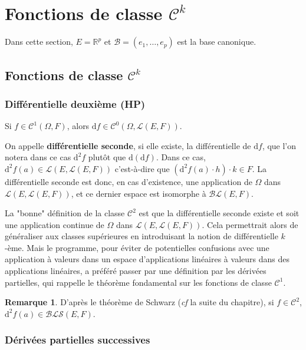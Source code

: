 \documentclass[french]{article}
\newcommand{\R}{\mathbb{R}}
\renewcommand{\d}{\text{d}}
\theoremstyle{plain}
\theoremstyle{definition}
\newtheorem*{rmq}{Remarque}
\theoremstyle{remark}
\begin{document}
\section{Fonctions de classe $\mathcal{C}^k$}

Dans cette section, $E=\R^p$ et $\mathcal{B}=(e_1,\ldots,e_p)$ est la base canonique.

\subsection{Fonctions de classe $\mathcal{C}^k$}

\subsubsection*{Différentielle deuxième (HP)}

Si $f\in\mathcal{C}^1(\Omega,F)$, alors $\d f\in\mathcal{C}^0(\Omega,\mathcal{L}(E,F))$.

\begin{dfn}
	On appelle \textbf{différentielle seconde}, si elle existe, la différentielle de $\d f$, que l'on notera dans ce cas $\d^2f$ plutôt que $\d(\d f)$. Dans ce cas, $\d^2 f(a)\in\mathcal{L}(E,\mathcal{L}(E,F))$ c'est-à-dire que $(\d^2 f(a)\cdot h)\cdot k\in F$. La différentielle seconde est donc, en cas d'existence, une application de $\Omega$ dans $\mathcal{L}(E,\mathcal{L}(E,F))$, et ce dernier espace est isomorphe à $\mathcal{BL}(E,F)$.
\end{dfn}

La "bonne" définition de la classe $\mathcal{C}^2$ est que la différentielle seconde existe et soit une application continue de $\Omega$ dans $\mathcal{L}(E,\mathcal{L}(E,F))$. Cela permettrait alors de généraliser aux classes supérieures en introduisant la notion de différentielle $k$-ème. Mais le programme, pour éviter de potentielles confusions avec une application à valeurs dans un espace d'applications linéaires à valeurs dans des applications linéaires, a préféré passer par une définition par les dérivées partielles, qui rappelle le théorème fondamental sur les fonctions de classe $\mathcal{C}^1$.

\begin{rmq}
	D'après le théorème de Schwarz (\textit{cf} la suite du chapitre), si $f\in\mathcal{C}^2$, $\d^2f(a)\in\mathcal{BLS}(E,F)$.
\end{rmq}

\subsubsection*{Dérivées partielles successives}
\end{document}
